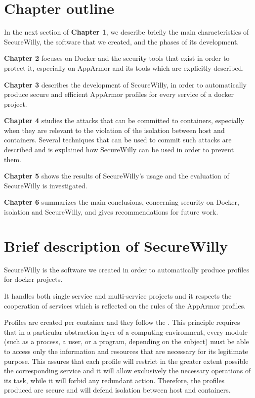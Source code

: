 \section{Chapter outline}
In the next section of \textbf{Chapter 1}, we describe briefly the main characteristics of SecureWilly, the software that we created, and the phases of its development.

\textbf{Chapter 2}  focuses on Docker and the security tools that exist in order to protect it, especially on AppArmor and its tools which are explicitly described.

\textbf{Chapter 3} describes the development of SecureWilly, in order to automatically produce secure and efficient AppArmor profiles for every service of a docker project. 

\textbf{Chapter 4} studies the attacks that can be committed to containers, especially when they are relevant to the violation of the isolation between host and containers. Several techniques that can be used to commit such attacks are described and is explained how SecureWilly can be used in order to prevent them.

\textbf{Chapter 5} shows the results of SecureWilly's usage and the evaluation of SecureWilly is investigated.

\textbf{Chapter 6} summarizes the main conclusions, concerning security on Docker, isolation and SecureWilly, and gives recommendations for future work. 

\section{Brief description of SecureWilly}
SecureWilly is the software we created in order to automatically produce profiles for docker projects.

It handles both single service and multi-service projects and it respects the cooperation of services which is reflected on the rules of the AppArmor profiles.

Profiles are created per container and they follow the . This principle requires that in a particular abstraction layer of a computing environment, every module (such as a process, a user, or a program, depending on the subject) must be able to access only the information and resources that are necessary for its legitimate purpose. \cite{polp} This assures that each profile will restrict in the greater extent possible the corresponding service and it will allow exclusively the necessary operations of its task, while it will forbid any redundant action. Therefore, the profiles produced are secure and will defend isolation between host and containers.

